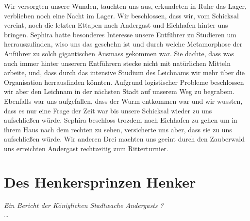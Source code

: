 \documentclass{book}
\begin{document}
    Wir versorgten unsere Wunden, tauchten uns aus, erkundeten in Ruhe das Lager, verblieben noch eine Nacht im Lager. Wir beschlossen, dass wir, vom Schicksal vereint, noch die letzten Ettapen nach Andergast und Eichhafen hinter uns bringen. Sephira hatte besonderes Interesse unsere Entführer zu Studieren um herrauszufinden, wiso uns das geschehn ist und durch welche Metamorphose der Anführer zu solch gigantischen Ausmass gekommen war. Sie dachte, dass was auch immer hinter unserern Entführern stecke nicht mit natürlichen Mitteln arbeite, und, dass durch das intensive Studium des Leichnams wir mehr über die Organisation herrausfinden könnten. Aufgrund logistischer Probleme beschlossen wir aber den Leichnam in der nächsten Stadt auf unserem Weg zu begrabem. Ebenfalls war uns aufgefallen, dass der Wurm entkommen war und wir wussten, dass es nur eine Frage der Zeit war bis unsere Schicksal wieder zu uns aufschließen würde. Sephira beschloss trozdem nach Eichhafen zu gehen um in ihrem Haus nach dem rechten zu sehen, versicherte uns aber, dass sie zu uns aufschließen würde. Wir anderen Drei machten uns geeint durch den Zauberwald uns erreichten Andergast rechtzeitig zum Ritterturnier.

    \chapter{Des Henkersprinzen Henker}
    \emph{Ein Bericht der Königlichen Stadtwache Andergasts ?}\\
    \dots
\end{document}
